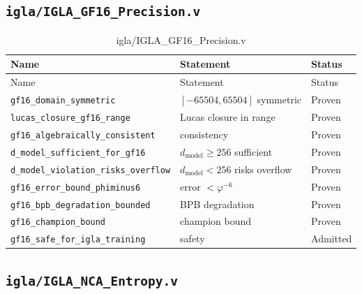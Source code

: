 \subsection{\texttt{igla/IGLA\_GF16\_Precision.v}}
\label{sec:A-coq-gf16}

\begin{longtable}{lll}
\toprule
Name & Statement & Status \\
\midrule
\endfirsthead
\toprule
Name & Statement & Status \\
\midrule
\endhead
\bottomrule
\endfoot
\bottomrule
\caption{igla/IGLA\_GF16\_Precision.v}
\endlastfoot
\texttt{gf16\_domain\_symmetric} & $[-65504,65504]$ symmetric & Proven \\
\texttt{lucas\_closure\_gf16\_range} & Lucas closure in range & Proven \\
\texttt{gf16\_algebraically\_consistent} & consistency & Proven \\
\texttt{d\_model\_sufficient\_for\_gf16} &
  $d_{\text{model}}\geq 256$ sufficient & Proven \\
\texttt{d\_model\_violation\_risks\_overflow} &
  $d_{\text{model}}<256$ risks overflow & Proven \\
\texttt{gf16\_error\_bound\_phiminus6} &
  error $<\varphi^{-6}$ & Proven \\
\texttt{gf16\_bpb\_degradation\_bounded} & BPB degradation & Proven \\
\texttt{gf16\_champion\_bound} & champion bound & Proven \\
\texttt{gf16\_safe\_for\_igla\_training} & safety & Admitted \\
\end{longtable}

\subsection{\texttt{igla/IGLA\_NCA\_Entropy.v}}
\label{sec:A-coq-nca}

